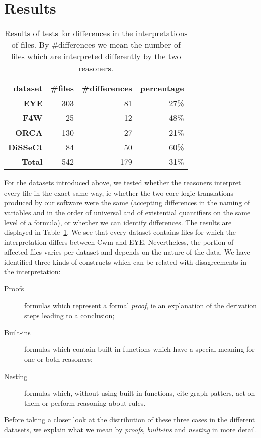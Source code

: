 \section{Results}\label{results}
\begin{table}
\begin{center}
\begin{tabular}{rrrr}
\hline
\bf dataset& \bf \#files & \bf \#differences & \bf percentage\\
\hline
 \bf EYE &303 & 81 &  27\%\\
 \bf F4W &25 & 12 &  48\% \\
 \bf ORCA & 130& 27 & 21\%\\
 \bf DiSSeCt & 84&50&  60\%\\
 \hline
 \bf Total & 542 & 179& 31\%\\
 \hline
\end{tabular}
\end{center}
\caption{Results of tests for differences in the interpretations of \nthree files. By \#differences we mean the number of files which are interpreted differently 
by the two reasoners.\label{result}}
\end{table}
For the datasets introduced above, we  tested whether the reasoners interpret every file in the exact same way, ie whether the two 
core logic translations produced by our 
software were the same (accepting differences in the naming of variables and in the order of universal and of existential quantifiers on the same 
level of a formula), 
or whether we can identify differences. The results 
are displayed 
in Table~\ref{result}. We see that every dataset contains files for which the interpretation differs between Cwm and EYE. Nevertheless, 
the portion of affected files varies per dataset and depends on the nature of the data. We have identified three kinds of constructs which can be related with disagreements 
in the interpretation:
\begin{description}
  \item[Proofs] formulas which represent a formal \emph{proof}, ie an explanation of the derivation steps leading to a conclusion; %
  \item[Built-ins] formulas which contain built-in functions which have a special meaning for one or both reasoners;
  \item[Nesting] formulas which, without using built-in functions, cite graph patters, act on them or perform
reasoning about rules.
\end{description}
Before taking a closer look at the distribution of these three cases in the different datasets, 
we explain what we mean by \emph{proofs}, \emph{built-ins} and \emph{nesting} in more detail.

